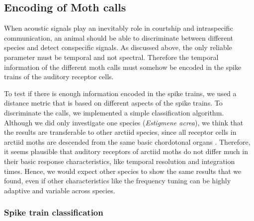 \documentclass[12pt,a4paper,pdftex]{article}
\newcommand{\species}[1]{\textit{#1}}
\begin{document}
\subsection*{Encoding of Moth calls}
When acoustic signals play an inevitably role in courtship and intraspecific communication, an animal should be able to discriminate between different species and detect conspecific signals. As discussed above, the only reliable parameter must be temporal and not spectral. Therefore the temporal information of the different moth calls must somehow be encoded in the spike trains of the auditory receptor cells. 

To test if there is enough information encoded in the spike trains, we used a distance metric that is based on different aspects of the spike trains. To discriminate the calls, we implemented a simple classification algorithm. Although we did only investigate one species (\species{Estigmene acrea}), we think that the results are transferable to other arctiid species, since all receptor cells in arctiid moths are descended from the same basic chordotonal organs \cite{yack2004}. Therefore, it seems plausible that auditory receptors of arctiid moths do not differ much in their basic response characteristics, like temporal resolution and integration times. Hence, we would expect other species to show the same results that we found, even if other characteristics like the frequency tuning can be highly adaptive and variable across species.


\subsubsection*{Spike train classification}
\end{document}
